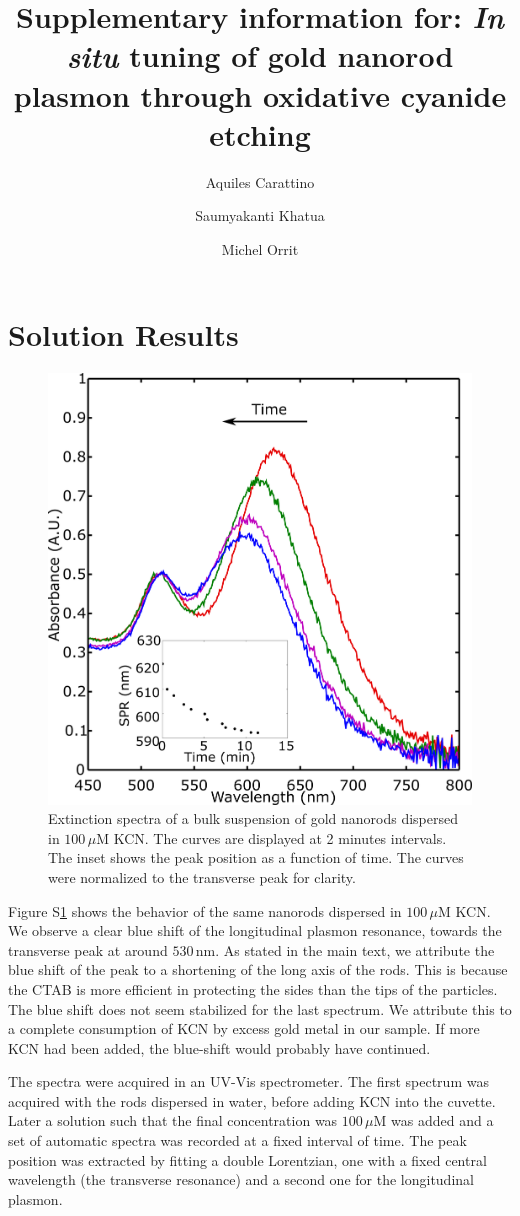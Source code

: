 \documentclass[journal=nalefd,manuscript=letter]{achemso}
\author{Aquiles Carattino}
\affiliation[Leiden]
{Huygens-Kamerlingh Onnes, Leiden, The Netherlands}
\author{Saumyakanti Khatua}
\affiliation{Indian Institute of Technology- Gandhinagar, Ahmedabad,  India}
\author{Michel Orrit}
\affiliation[Leiden]
{Huygens-Kamerlingh Onnes, Leiden, The Netherlands}
\title{Supplementary information for: \textit{In situ} tuning of gold nanorod plasmon through oxidative cyanide
etching}
\newcommand{\nm}{\ensuremath{\,\textrm{nm}}}
\newcommand{\uM}{\ensuremath{\,\mu\textrm{M}}}
\begin{document}
\maketitle

\section{Solution Results}
\begin{figure}[htp]
 \centering
 \includegraphics[width=0.45\linewidth]{Figures/04_Supporting/01_Bulk/01_bulk.png}
 \caption{Extinction spectra of a bulk suspension of gold nanorods dispersed in
 $100\uM$ KCN. The curves are displayed at 2 minutes intervals. The
 inset shows the peak position as a function of time. The curves were normalized
 to the transverse peak for clarity.}
 \label{fig:Bulk}
\end{figure}

Figure S\ref{fig:Bulk} shows the behavior of the same nanorods dispersed in
$100\uM$ KCN. We observe a clear blue shift of the longitudinal plasmon
resonance, towards the transverse peak at around $530\nm$. As stated in the main
text, we attribute the blue shift of the peak to a shortening of the long axis
of the rods. This is because the CTAB is more efficient in protecting the sides
than the tips of the particles. The blue shift does not seem stabilized for the last spectrum. We attribute this to a complete consumption of KCN by excess gold metal in our sample. If more KCN had been added, the blue-shift would probably have continued.

The spectra were acquired in an UV-Vis spectrometer. The first spectrum was
acquired with the rods dispersed in water, before adding KCN into the cuvette.
Later a solution such that the final concentration was $100\uM$ was added and a
set of automatic spectra was recorded at a fixed interval of time. The peak
position was extracted by fitting a double Lorentzian, one with a fixed central
wavelength (the transverse resonance) and a second one for the longitudinal
plasmon.
\end{document}
